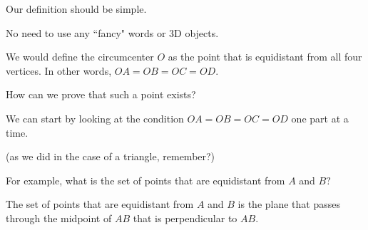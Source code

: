 Our definition should be simple. 

No need to use any ``fancy" words or 3D objects.



We would define the circumcenter $O$ as the point that is equidistant from all four vertices. In other words, $OA = OB = OC = OD$.

How can we prove that such a point exists?

We can start by looking at the condition $OA = OB = OC = OD$ one part at a time.

(as we did in the case of a triangle, remember?)

For example, what is the set of points that are equidistant from $A$ and $B?$








The set of points that are equidistant from $A$ and $B$ is the plane that passes through the midpoint of $AB$ that is perpendicular to $AB.$




